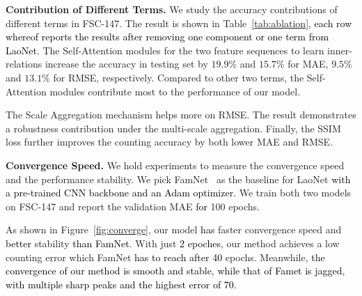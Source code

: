 \documentclass{article}
\newcommand\XP[1]{\textcolor{black}{#1}}%
\newcommand\XPDel[1]{\textcolor{black}{\sout{#1}}}
\begin{document}
\noindent \textbf{Contribution of Different Terms.} We study the accuracy contributions of different terms in FSC-147. The result is shown in Table~\ref{tab:ablation}, \XP{each row whereof reports the results after removing one component or one term from LaoNet.}
The Self-Attention modules for the two feature sequences to learn inner-relations increase the accuracy in testing set by $19.9\%$ and $15.7\%$ for MAE, $9.5\%$ and $13.1\%$ for RMSE, respectively. Compared to other two terms, the Self-Attention modules contribute most to the performance of our model.

The Scale Aggregation mechanism helps more on RMSE. The result demonstrates a robustness contribution under the multi-scale aggregation. Finally, the SSIM loss further improves the counting accuracy by both lower MAE and RMSE.


\noindent \textbf{Convergence Speed.} We hold experiments to measure the convergence speed and the performance stability. We pick FamNet~\cite{ranjan2021learning} as the baseline for LaoNet \XP{with a pre-trained CNN backbone and an Adam optimizer.} We train both two models on FSC-147 and report the validation MAE \XP{for} 100 epochs. 

As shown in Figure~\ref{fig:converge}, our model \XP{has} faster convergence speed and \XP{better} stability \XP{than FamNet}. With just \XP{2 epoches}, our method achieves a low counting error which FamNet \XP{has to reach after 40} epochs. Meanwhile, \XP{the convergence of our method is smooth and stable, while that of Famet is jagged, with multiple sharp peaks and the highest error of 70.}

\end{document}
